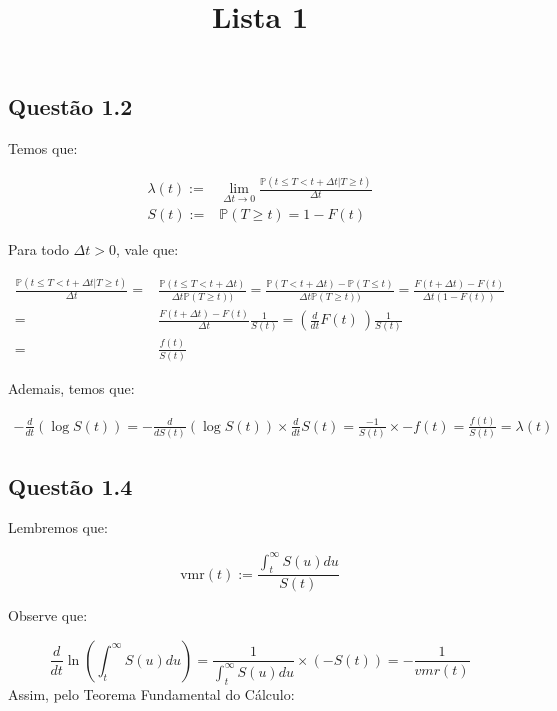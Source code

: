 \documentclass[
]{article}
\title{Lista 1}
\author{}
\date{\vspace{-2.5em}}
\begin{document}
\maketitle

\captionsetup[table]{labelformat=empty}

\hypertarget{questuxe3o-1.2}{%
\subsection{Questão 1.2}\label{questuxe3o-1.2}}

Temos que:

\[
\begin{aligned}
\lambda(t):=&\lim_{\Delta t\rightarrow0}\frac{\mathbb{P}(t\leq T<t+\Delta t|T\ge t)}{\Delta t}\\
S(t):=&\mathbb{P}(T\ge t)=1-F(t)
\end{aligned}
\]

Para todo \(\Delta t>0\), vale que:

\[
\begin{aligned}
\frac{\mathbb{P}(t\leq T<t+\Delta t|T\ge t)}{\Delta t}=&\frac{\mathbb{P}(t\leq T<t+\Delta t)}{\Delta t \mathbb{P}(T\ge t))}=\frac{\mathbb{P}(T<t+\Delta t)-\mathbb{P}(T\le t)}{\Delta t \mathbb{P}(T\ge t))}
=\frac{F(t+\Delta t)-F(t)}{\Delta t (1-F(t))}\\
=&\frac{F(t+\Delta t)-F(t)}{\Delta t}\frac{1}{S(t)}=\left(\frac{d}{dt}F(t)\ \right) \frac{1}{S(t)}\\
=&\frac{f(t)}{S(t)}
\end{aligned}
\]

Ademais, temos que:

\[
\begin{aligned}
-\frac{d}{dt}\left(\log S(t)\right)=-\frac{d}{dS(t)}(\log S(t))\times \frac{d}{dt}S(t)=\frac{-1}{S(t)}\times -f(t)=\frac{f(t)}{S(t)}=\lambda(t)
\end{aligned}
\]

\hypertarget{questuxe3o-1.4}{%
\subsection{Questão 1.4}\label{questuxe3o-1.4}}

Lembremos que:

\[
\text{vmr}(t):=\frac{\int_t^\infty S(u)du}{S(t)}
\]

Observe que:

\[
\frac{d}{dt}\ln\left(\int_t^\infty S(u)du\right)=\frac{1}{\int_t^\infty S(u)du}\times(-S(t))=-\frac{1}{vmr(t)}
\] Assim, pelo Teorema Fundamental do Cálculo:
\end{document}
